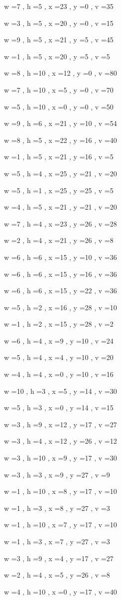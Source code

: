 \documentclass[11pt]{article}
\begin{document}
w =7 , h =5 , x =23 , y =0 , v =35
\par
w =3 , h =5 , x =20 , y =0 , v =15
\par
w =9 , h =5 , x =21 , y =5 , v =45
\par
w =1 , h =5 , x =20 , y =5 , v =5
\par
w =8 , h =10 , x =12 , y =0 , v =80
\par
w =7 , h =10 , x =5 , y =0 , v =70
\par
w =5 , h =10 , x =0 , y =0 , v =50
\par
w =9 , h =6 , x =21 , y =10 , v =54
\par
w =8 , h =5 , x =22 , y =16 , v =40
\par
w =1 , h =5 , x =21 , y =16 , v =5
\par
w =5 , h =4 , x =25 , y =21 , v =20
\par
w =5 , h =1 , x =25 , y =25 , v =5
\par
w =4 , h =5 , x =21 , y =21 , v =20
\par
w =7 , h =4 , x =23 , y =26 , v =28
\par
w =2 , h =4 , x =21 , y =26 , v =8
\par
w =6 , h =6 , x =15 , y =10 , v =36
\par
w =6 , h =6 , x =15 , y =16 , v =36
\par
w =6 , h =6 , x =15 , y =22 , v =36
\par
w =5 , h =2 , x =16 , y =28 , v =10
\par
w =1 , h =2 , x =15 , y =28 , v =2
\par
w =6 , h =4 , x =9 , y =10 , v =24
\par
w =5 , h =4 , x =4 , y =10 , v =20
\par
w =4 , h =4 , x =0 , y =10 , v =16
\par
w =10 , h =3 , x =5 , y =14 , v =30
\par
w =5 , h =3 , x =0 , y =14 , v =15
\par
w =3 , h =9 , x =12 , y =17 , v =27
\par
w =3 , h =4 , x =12 , y =26 , v =12
\par
w =3 , h =10 , x =9 , y =17 , v =30
\par
w =3 , h =3 , x =9 , y =27 , v =9
\par
w =1 , h =10 , x =8 , y =17 , v =10
\par
w =1 , h =3 , x =8 , y =27 , v =3
\par
w =1 , h =10 , x =7 , y =17 , v =10
\par
w =1 , h =3 , x =7 , y =27 , v =3
\par
w =3 , h =9 , x =4 , y =17 , v =27
\par
w =2 , h =4 , x =5 , y =26 , v =8
\par
w =4 , h =10 , x =0 , y =17 , v =40
\par
\newpage
\end{document}
